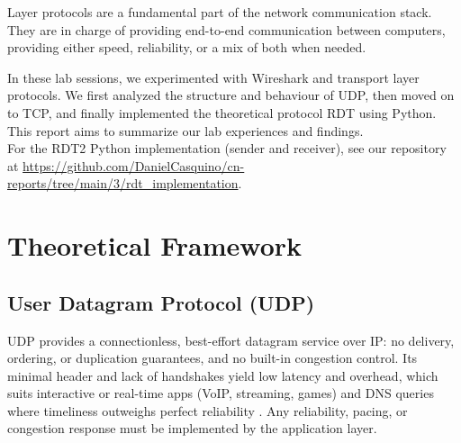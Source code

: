 % 
% 
% 
% 
 Layer protocols are a fundamental part of the network communication
stack. They are in charge of providing end-to-end communication between computers, providing either
speed, reliability, or a mix of both when needed.

In these lab sessions, we experimented with Wireshark and transport layer
protocols. We first analyzed the structure and behaviour of UDP, then moved on
to TCP, and finally implemented the theoretical protocol RDT using Python. This
report aims to summarize our lab experiences and findings. \\

For the RDT2 Python implementation (sender and receiver), see our repository at
\url{https://github.com/DanielCasquino/cn-reports/tree/main/3/rdt_implementation}.




\section{Theoretical Framework}

\subsection{User Datagram Protocol (UDP)}
UDP provides a connectionless, best-effort datagram service over IP: no
delivery, ordering, or duplication guarantees, and no built-in congestion
control. Its minimal header and lack of handshakes yield low latency and
overhead, which suits interactive or real-time apps (VoIP, streaming, games)
and DNS queries where timeliness outweighs perfect reliability
\cite{rfc768,kurose:topdown8e}. Any reliability, pacing, or congestion response
must be implemented by the application layer.

